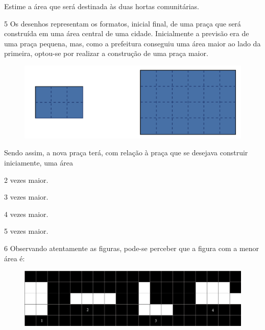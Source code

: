 Estime a área que será destinada às duas hortas comunitárias.


\pagebreak

\num{5} Os desenhos representam os formatos, inicial  final, de uma praça que será construída em uma
área central de uma cidade. Inicialmente a previsão era de uma praça
pequena, mas, como a prefeitura conseguiu uma área maior ao lado da
primeira, optou-se por realizar a construção de uma praça maior.

\begin{figure}[htpb!]
\centering
\includegraphics[width=.5\textwidth]{../ilustracoes/MAT5/SAEB_5ANO_MAT_figura39.png}
\end{figure}

Sendo assim, a nova praça terá, com relação à praça que se
desejava construir iniciamente, uma área

\begin{minipage}{.5\textwidth}
\begin{escolha}
\item
  2 vezes maior.
\item
  3 vezes maior.
\item
  4 vezes maior.
\item
  5 vezes maior.
\end{escolha}
\end{minipage}

\num{6} Observando atentamente as figuras, pode-se perceber que a figura com a menor área é:

\begin{figure}[htpb!]
\includegraphics[width=\textwidth]{../ilustracoes/MAT5/SAEB_5ANO_MAT_figura40.png}
\end{figure}


